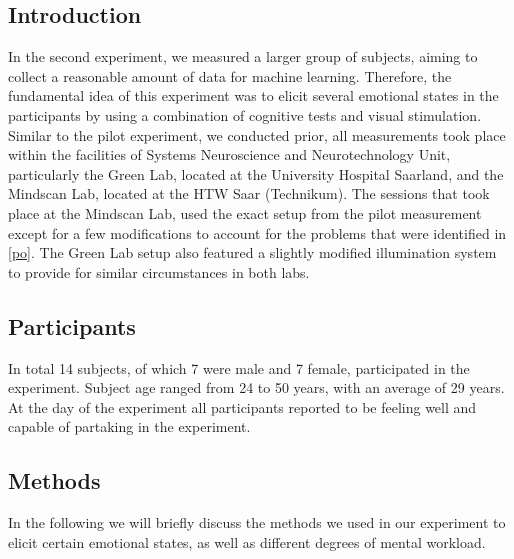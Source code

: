 \subsection{Introduction}
In the second experiment, we measured a larger group of subjects, aiming to collect a reasonable amount of data for machine learning. Therefore, the fundamental idea of this experiment was to elicit several emotional states in the participants by using a combination of cognitive tests and visual stimulation.  
Similar to the pilot experiment, we conducted prior, all measurements took place within the facilities of Systems Neuroscience and Neurotechnology Unit, particularly the Green Lab, located at the University Hospital Saarland, and the Mindscan Lab, located at the HTW Saar (Technikum). The sessions that took place at the Mindscan Lab, used the exact setup from the pilot measurement except for a few modifications to account for the problems that were identified in \ref{po}. The Green Lab setup also featured a slightly modified illumination system to provide for similar circumstances in both labs.
 
\subsection{Participants}
In total 14 subjects, of which 7 were male and 7 female, participated in the experiment. Subject age ranged from 24 to 50 years, with an average of 29 years. At the day of the experiment all participants reported to be feeling well and capable of partaking in the experiment. 
\subsection{Methods}
In the following we will briefly discuss the methods we used in our experiment to elicit certain emotional states, as well as different degrees of mental workload.

